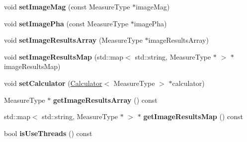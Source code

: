\begin{DoxyCompactItemize}
\item 
void {\bfseries set\+Image\+Mag} (const Measure\+Type $\ast$image\+Mag)\hypertarget{class_ox_1_1_image_calculator_a236d0b1cdb54875d00a9b83a4ec2c521}{}\label{class_ox_1_1_image_calculator_a236d0b1cdb54875d00a9b83a4ec2c521}

\item 
void {\bfseries set\+Image\+Pha} (const Measure\+Type $\ast$image\+Pha)\hypertarget{class_ox_1_1_image_calculator_aa3318da28fa8cdefee04aedd6c4adda5}{}\label{class_ox_1_1_image_calculator_aa3318da28fa8cdefee04aedd6c4adda5}

\item 
void {\bfseries set\+Image\+Results\+Array} (Measure\+Type $\ast$image\+Results\+Array)\hypertarget{class_ox_1_1_image_calculator_a796dc41ea1684b11800728dec6e77041}{}\label{class_ox_1_1_image_calculator_a796dc41ea1684b11800728dec6e77041}

\item 
void {\bfseries set\+Image\+Results\+Map} (std\+::map$<$ std\+::string, Measure\+Type $\ast$ $>$ $\ast$image\+Results\+Map)\hypertarget{class_ox_1_1_image_calculator_ac7d8f5e08f7a8d8fd038f5d44c5b6613}{}\label{class_ox_1_1_image_calculator_ac7d8f5e08f7a8d8fd038f5d44c5b6613}

\item 
void {\bfseries set\+Calculator} (\hyperlink{class_ox_1_1_calculator}{Calculator}$<$ Measure\+Type $>$ $\ast$calculator)\hypertarget{class_ox_1_1_image_calculator_a7b0c5d65c49ed3afd34668119b476383}{}\label{class_ox_1_1_image_calculator_a7b0c5d65c49ed3afd34668119b476383}

\item 
Measure\+Type $\ast$ {\bfseries get\+Image\+Results\+Array} () const \hypertarget{class_ox_1_1_image_calculator_aa91a227b27fd21beb362e16c9df9af50}{}\label{class_ox_1_1_image_calculator_aa91a227b27fd21beb362e16c9df9af50}

\item 
std\+::map$<$ std\+::string, Measure\+Type $\ast$ $>$ $\ast$ {\bfseries get\+Image\+Results\+Map} () const \hypertarget{class_ox_1_1_image_calculator_ad101ab2e2963202b3728c7ffd5d861be}{}\label{class_ox_1_1_image_calculator_ad101ab2e2963202b3728c7ffd5d861be}

\item 
bool {\bfseries is\+Use\+Threads} () const \hypertarget{class_ox_1_1_image_calculator_a9adb3d4b4485033d24403199a19b4925}{}\label{class_ox_1_1_image_calculator_a9adb3d4b4485033d24403199a19b4925}


\end{DoxyCompactItemize}
